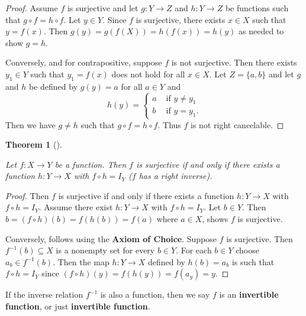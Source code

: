 \documentclass[
  letterpaper,
  10pt,
  reqno,
  twopage,
  openany]{book}
\theoremstyle{plain}
\theoremstyle{definition}
\theoremstyle{definition}
\theoremstyle{definition}
\theoremstyle{plain}
\theoremstyle{plain}
\newtheorem{theorem}{Theorem}[chapter]
\theoremstyle{remark}
\begin{document}
\begin{proof}

Assume \(f\) is surjective and let \(g:Y\to Z\) and \(h:Y\to Z\) be
functions such that \(g\circ f=h\circ f\). Let \(y\in Y\). Since \(f\)
is surjective, there exists \(x\in X\) such that \(y=f(x)\). Then
\(g(y)=g(f(X))=h(f(x))=h(y)\) as needed to show \(g=h\).

Conversely, and for contrapositive, suppose \(f\) is not surjective.
Then there exists \(y_1\in Y\) such that \(y_1=f(x)\) does not hold for
all \(x\in X\). Let \(Z=\{a,b\}\) and let \(g\) and \(h\) be defined by
\(g(y)=a\) for all \(a\in Y\) and \[
h(y)=\begin{cases}
a & \text{ if } y\neq y_1 \\
b & \text{ if } y=y_1.
\end{cases}
\] Then we have \(g\neq h\) such that \(g\circ f=h\circ f\). Thus \(f\)
is not right cancelable.

\end{proof}

\leavevmode{}%
\begin{theorem}[]\label{thm-surjective-right-inverse}

Let \(f:X\to Y\) be a function. Then \(f\) is surjective if and only if
there exists a function \(h:Y\to X\) with \(f\circ h = I_Y\) (\(f\) has
a right inverse).

\end{theorem}

\begin{proof}

Then \(f\) is surjective if and only if there exists a function
\(h:Y \to X\) with \(f \circ h = I_Y.\) Assume there exist \(h:Y\to X\)
with \(f \circ h=I_Y\). Let \(b\in Y\). Then
\(b=(f\circ h)(b)=f(h(b))=f(a)\) where \(a\in X\), shows \(f\) is
surjective.

Conversely, follows using the \textbf{Axiom of
Choice}. Suppose \(f\) is surjective. Then \(f^{-1}(b)\subseteq X\) is a
nonempty set for every \(b\in Y\). For each \(b\in Y\) choose
\(a_b\in f^{-1}(b)\). Then the map \(h:Y\to X\) defined by \(h(b)=a_b\)
is such that \(f\circ h=I_Y\) since \((f\circ h)(y)=f(h(y))=f(a_y)=y\).

\end{proof}

If the inverse relation \(f^{-1}\) is also a function, then we say \(f\)
is an \textbf{invertible function}, or just
 \textbf{invertible function}.
\end{document}
